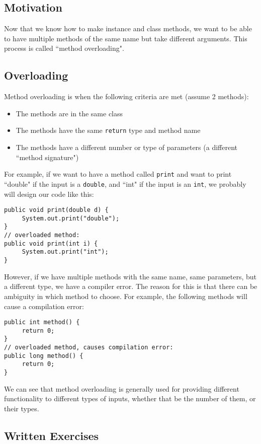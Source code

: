 
\subsection{Motivation}
Now that we know how to make instance and class methods, we want to be able to have multiple methods of the same name but take different arguments. This process is called ``method overloading".

\subsection{Overloading}
Method overloading is when the following criteria are met (assume 2 methods):
\begin{itemize}
\item The methods are in the same class
\item The methods have the same \verb|return| type and method name
\item The methods have a different number or type of parameters (a different ``method signature")
\end{itemize}

For example, if we want to have a method called \verb|print| and want to print ``double" if the input is a \verb|double|, and ``int" if the input is an \verb|int|, we probably will design our code like this:
\begin{lstlisting}
public void print(double d) {
     System.out.print("double");
}
// overloaded method:
public void print(int i) {
     System.out.print("int");
}
\end{lstlisting}
However, if we have multiple methods with the same name, same parameters, but a different type, we have a compiler error. The reason for this is that there can be ambiguity in which method to choose. For example, the following methods will cause a compilation error:

\begin{lstlisting}
public int method() {
     return 0;
}
// overloaded method, causes compilation error:
public long method() {
     return 0;
}
\end{lstlisting}
We can see that method overloading is generally used for providing different functionality to different types of inputs, whether that be the number of them, or their types. 

\subsection{Written Exercises}

